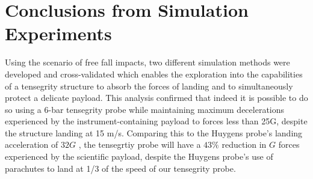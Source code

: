 \section{Conclusions from Simulation Experiments}
Using the scenario of free fall impacts, two different simulation methods were developed and cross-validated which enables the exploration into the capabilities of a tensegrity structure to absorb the forces of landing and to simultaneously protect a delicate payload.  This analysis confirmed that indeed it is possible to do so using a 6-bar tensegrity probe while maintaining maximum decelerations experienced by the instrument-containing payload to forces less than 25G, despite the structure landing at 15 m/s.   Comparing this to the Huygens probe's landing acceleration of \(32G\) \cite{lorenz1994huygens}, the tensegrtiy probe will have a \(43\% \) reduction in \(G\) forces experienced by the scientific payload, despite the Huygens probe's use of parachutes to land at 1/3 of the speed of our tensegrity probe.
